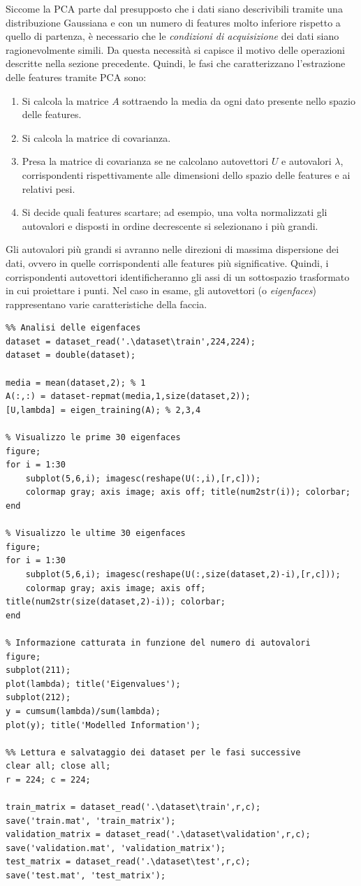 \documentclass[12pt]{article}
\begin{document}
Siccome la PCA parte dal presupposto che i dati siano descrivibili tramite una distribuzione Gaussiana e con un numero di features molto inferiore rispetto a quello di partenza, è necessario che le \textit{condizioni di acquisizione} dei dati siano ragionevolmente simili. Da questa necessità si capisce il motivo delle operazioni descritte nella sezione precedente. Quindi, le fasi che caratterizzano l'estrazione delle features tramite PCA sono:
\begin{enumerate}
    \item Si calcola la matrice $A$ sottraendo la media da ogni dato presente nello spazio delle features.
    \item Si calcola la matrice di covarianza.
    \item Presa la matrice di covarianza se ne calcolano autovettori $U$ e autovalori $\lambda$, corrispondenti rispettivamente alle dimensioni dello spazio delle features e ai relativi pesi.
    \item Si decide quali features scartare; ad esempio, una volta normalizzati gli autovalori e disposti in ordine decrescente si selezionano i più grandi.
\end{enumerate}
Gli autovalori più grandi si avranno nelle direzioni di massima dispersione dei dati, ovvero in quelle corrispondenti alle features più significative. Quindi, i corrispondenti autovettori identificheranno gli assi di un sottospazio trasformato in cui proiettare i punti. Nel caso in esame, gli autovettori (o \textit{eigenfaces}) rappresentano varie caratteristiche della faccia.
\begin{verbatim}
%% Analisi delle eigenfaces
dataset = dataset_read('.\dataset\train',224,224);
dataset = double(dataset);

media = mean(dataset,2); % 1
A(:,:) = dataset-repmat(media,1,size(dataset,2));
[U,lambda] = eigen_training(A); % 2,3,4

% Visualizzo le prime 30 eigenfaces
figure;
for i = 1:30
    subplot(5,6,i); imagesc(reshape(U(:,i),[r,c]));
    colormap gray; axis image; axis off; title(num2str(i)); colorbar;
end

% Visualizzo le ultime 30 eigenfaces
figure;
for i = 1:30
    subplot(5,6,i); imagesc(reshape(U(:,size(dataset,2)-i),[r,c]));
    colormap gray; axis image; axis off; title(num2str(size(dataset,2)-i)); colorbar;
end

% Informazione catturata in funzione del numero di autovalori
figure;
subplot(211);
plot(lambda); title('Eigenvalues');
subplot(212);
y = cumsum(lambda)/sum(lambda);
plot(y); title('Modelled Information');

%% Lettura e salvataggio dei dataset per le fasi successive
clear all; close all;
r = 224; c = 224;

train_matrix = dataset_read('.\dataset\train',r,c);
save('train.mat', 'train_matrix');
validation_matrix = dataset_read('.\dataset\validation',r,c);
save('validation.mat', 'validation_matrix');
test_matrix = dataset_read('.\dataset\test',r,c);
save('test.mat', 'test_matrix');
\end{verbatim}
\end{document}
